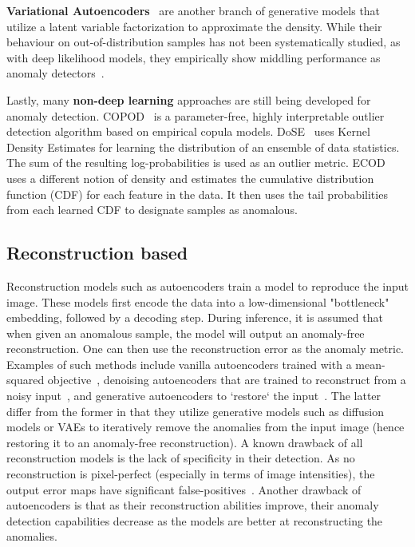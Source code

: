 \textbf{Variational Autoencoders}~\cite{kingma2013auto} are another branch of generative models that utilize a latent variable factorization to approximate the density. While their behaviour on out-of-distribution samples has not been systematically studied, as with deep likelihood models, they empirically show middling performance as anomaly detectors~\cite{baur2021,kascenasRoleNoiseDenoising2023}.

Lastly, many \textbf{non-deep learning} approaches are still being developed for anomaly detection. COPOD~\cite{copod} is a parameter-free, highly interpretable outlier detection algorithm based on empirical copula models. DoSE~\cite{pmlr-dose} uses Kernel Density Estimates for learning the distribution of an ensemble of data statistics. The sum of the resulting log-probabilities is used as an outlier metric. ECOD~\cite{li_ecod_2022} uses a different notion of density and estimates the cumulative distribution function (CDF) for each feature in the data. It then uses the tail probabilities from each learned CDF to designate samples as anomalous.

\subsection*{Reconstruction based}

Reconstruction models such as autoencoders train a model to reproduce the input image. These models first encode the data into a low-dimensional "bottleneck" embedding, followed by a decoding step. During inference, it is assumed that when given an anomalous sample, the model will output an anomaly-free reconstruction. One can then use the reconstruction error as the anomaly metric. Examples of such methods include vanilla autoencoders trained with a mean-squared objective~\cite{aelu2023}, denoising autoencoders that are trained to reconstruct from a noisy input~\cite{dae-kascenas22a}, and generative autoencoders to `restore` the input~\cite{grahamDenoisingDiffusionModels2023,wyattAnoddpmAnomalyDetection2022}. The latter differ from the former in that they utilize generative models such as diffusion models or VAEs to iteratively remove the anomalies from the input image (hence restoring it to an anomaly-free reconstruction).
A known drawback of all reconstruction models is the lack of specificity in their detection. As no reconstruction is pixel-perfect (especially in terms of image intensities), the output error maps have significant false-positives~\cite{baur2021}. Another drawback of autoencoders is that as their reconstruction abilities improve, their anomaly detection capabilities decrease as the models are better at reconstructing the anomalies.

